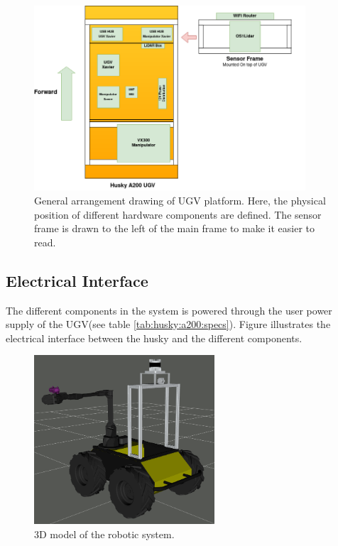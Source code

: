 \begin{figure}[H]
  \centering
   \includegraphics[width = 0.9\textwidth]{Figures/general_arrangement.drawio.png}
  \caption{General arrangement drawing of UGV platform. Here, the physical position of different hardware components are defined. The sensor frame is drawn to the left of the main frame to make it easier to read.}
  \label{fig:general_arrangement}
\end{figure}


\subsection{Electrical Interface}
The different components in the system is powered through the user power supply of the UGV(see table \ref{tab:husky:a200:specs}). Figure illustrates the electrical interface between the husky and the different components.

\begin{figure}[H]
  \centering
  \includegraphics[width = 0.6\textwidth]{Figures/husky_initiated.png}
  \caption{3D model of the robotic system.}
  \label{fig:circuit_diagram}
\end{figure}


